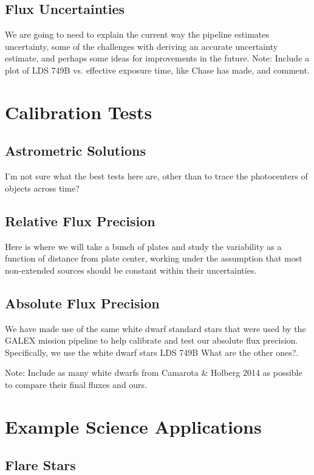 \documentclass[preprint]{aastex}
\begin{document}
\subsection{Flux Uncertainties}
{\color{red}We are going to need to explain the current way the pipeline estimates uncertainty, some of the challenges with deriving an accurate uncertainty estimate, and perhaps some ideas for improvements in the future.}
{\color{red}Note: Include a plot of LDS 749B vs. effective exposure time, like Chase has made, and comment.}

\section{Calibration Tests}
\label{calibration}

\subsection{Astrometric Solutions}
{\color{red}I'm not sure what the best tests here are, other than to trace the photocenters of objects across time?}

\subsection{Relative Flux Precision}
{\color{red}Here is where we will take a bunch of plates and study the variability as a function of distance from plate center, working under the assumption that most non-extended sources should be constant within their uncertainties.}

\subsection{Absolute Flux Precision}
We have made use of the same white dwarf standard stars that were used by the GALEX mission pipeline to help calibrate and test our absolute flux precision.  Specifically, we use the white dwarf stars LDS 749B {\color{red}What are the other ones?}.

{\color{red}Note: Include as many white dwarfs from Camarota \& Holberg 2014 as possible to compare their final fluxes and ours.}

\section{Example Science Applications}
\label{scienceexamples}

\subsection{Flare Stars}
\end{document}
